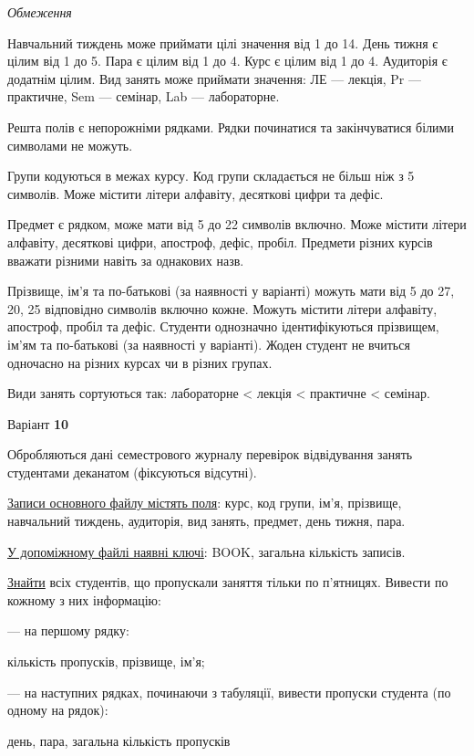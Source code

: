 \documentclass[11pt, ukrainian]{article}
\begin{document}
\bigskip\textit{Обмеження}

Навчальний тиждень може приймати цілі значення від 1 до 14.
День тижня є цілим від 1 до 5. Пара є цілим від 1 до 4.
Курс є цілим від 1 до 4. Аудиторія є додатнім цілим.
Вид занять може приймати значення:
ЛЕ --- лекція, Pr --- практичне, Sem --- семінар, Lab --- лабораторне.

Решта полів є непорожніми рядками.
Рядки починатися та закінчуватися білими символами не можуть.

Групи кодуються в межах курсу.
Код групи складається не більш ніж з 5 символів.
Може містити літери алфавіту, десяткові цифри та дефіс.

Предмет є рядком, може мати від 5 до 22 символів включно.
Може містити літери алфавіту, десяткові цифри, апостроф, дефіс, пробіл.
Предмети різних курсів вважати різними навіть за однакових назв.

Прізвище, ім’я та по-батькові (за наявності у варіанті)
можуть мати від 5 до 27, 20, 25 відповідно символів включно кожне.
Можуть містити літери алфавіту, апостроф, пробіл та дефіс.
Студенти однозначно ідентифікуються прізвищем, ім’ям та по-батькові (за наявності у варіанті).
Жоден студент не вчиться одночасно на різних курсах чи в різних групах.

Види занять сортуються так: лабораторне < лекція < практичне < семінар.



\par
\newpage
{\center Варіант  \No \textbf { 10 }\par}
\bigskip
Обробляються дані семестрового журналу перевірок відвідування занять студентами деканатом (фіксуються відсутні). 

\underline{Записи основного файлу містять поля}: курс, код групи, ім’я, прізвище, навчальний тиждень, аудиторія, вид занять, предмет, день тижня, пара.

\underline{У допоміжному файлі наявні ключі}: BOOK, загальна кількість записів.

\underline{Знайти} всіх студентів, що пропускали заняття тільки по п’ятницях. Вивести по кожному з них інформацію:\par
{\noindent}--- на першому рядку:\par
кількість пропусків, прізвище, ім’я;

{\noindent}--- на наступних рядках, починаючи з табуляції, вивести пропуски студента (по одному на рядок):\par
день, пара, загальна кількість пропусків
\end{document}

